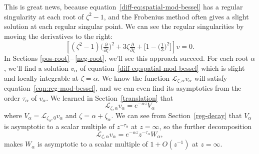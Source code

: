 \documentclass{article}
\theoremstyle{definition}
\newcommand{\fracderiv}[3]{\partial^{#1}_{#2, #3}}
\newcommand{\laplace}{\mathcal{L}}
\begin{document}
This is great news, because equation~\eqref{diff-eq:spatial-mod-bessel} has a regular singularity at each root of $\zeta^2 - 1$, and the Frobenius method often gives a slight solution at each regular singular point. We can see the regular singularities by moving the derivatives to the right:
\[ \left[ (\zeta^2 - 1) \big(\tfrac{\partial}{\partial \zeta}\big)^2 + 3\zeta \tfrac{\partial}{\partial \zeta} + \big[ 1 - \big(\tfrac{1}{3}\big)^2 \big] \right] v = 0. \]
In Sections \ref{pos-root}\,--\,\ref{neg-root}, we’ll see this approach succeed. For each root $\alpha$, we'll find a solution $v_\alpha$ of equation~\eqref{diff-eq:spatial-mod-bessel} which is slight and locally integrable at $\zeta = \alpha$. We know the function $\laplace_{\zeta, \alpha} v_\alpha$ will satisfy equation~\eqref{eqn:reg-mod-bessel}, and we can even find its asymptotics from the order $\tau_\alpha$ of $v_\alpha$. We learned in Section~\ref{translation} that
\[ \laplace_{\zeta, \alpha} v_\alpha = e^{-\alpha z} V_\alpha \]
where $V_\alpha = \laplace_{\zeta_\alpha, 0} v_\alpha$ and $\zeta = \alpha + \zeta_\alpha$. We can see from Section~\ref{reg-decay} that $V_\alpha$ is asymptotic to a scalar multiple of $z^{ - \tau_\alpha}$ at $z = \infty$, so the further decomposition
\[ \laplace_{\zeta, \alpha} v_\alpha = e^{-\alpha z} z^{-\tau_\alpha} W_\alpha, \]
makes $W_\alpha$ is asymptotic to a scalar multiple of $1+O(z^{-1})$ at $z = \infty$.
\end{document}
